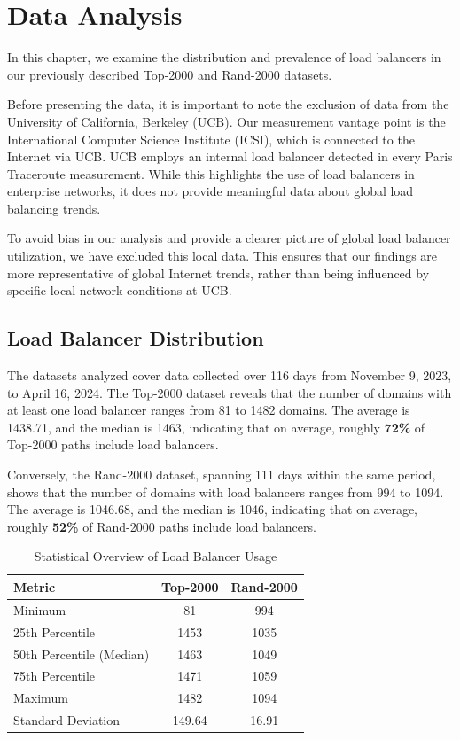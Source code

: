 \documentclass[12pt]{cwru_thesis}
\begin{document}
\chapter{Data Analysis}

In this chapter, we examine the distribution and prevalence of load balancers in our previously described Top-2000 and Rand-2000 datasets.

Before presenting the data, it is important to note the exclusion of data from the University of California, Berkeley (UCB). Our measurement vantage point is the International Computer Science Institute (ICSI), which is connected to the Internet via UCB. UCB employs an internal load balancer detected in every Paris Traceroute measurement. While this highlights the use of load balancers in enterprise networks, it does not provide meaningful data about global load balancing trends.

To avoid bias in our analysis and provide a clearer picture of global load balancer utilization, we have excluded this local data. This ensures that our findings are more representative of global Internet trends, rather than being influenced by specific local network conditions at UCB.

\section{Load Balancer Distribution}

The datasets analyzed cover data collected over 116 days from November 9, 2023, to April 16, 2024. The Top-2000 dataset reveals that the number of domains with at least one load balancer ranges from 81 to 1482 domains. The average is 1438.71, and the median is 1463, indicating that on average, roughly \textbf{72\%} of Top-2000 paths include load balancers.

Conversely, the Rand-2000 dataset, spanning 111 days within the same period, shows that the number of domains with load balancers ranges from 994 to 1094. The average is 1046.68, and the median is 1046, indicating that on average, roughly \textbf{52\%} of Rand-2000 paths include load balancers. 

\begin{table}[h]
\centering
\begin{tabular}{|l|c|c|}
\hline
\textbf{Metric} & \textbf{Top-2000} & \textbf{Rand-2000} \\
\hline
Minimum & 81 & 994 \\
\hline
25th Percentile & 1453 & 1035 \\
\hline
50th Percentile (Median) & 1463 & 1049 \\
\hline
75th Percentile  & 1471 & 1059 \\
\hline
Maximum & 1482 & 1094 \\
\hline
Standard Deviation & 149.64 & 16.91 \\
\hline
\end{tabular}
\caption{Statistical Overview of Load Balancer Usage}
\label{tab:stats_overview}
\end{table}
\end{document}

